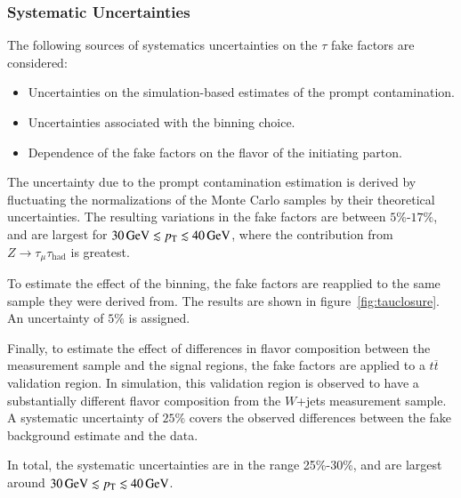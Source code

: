 \subsubsection{Systematic Uncertainties}\label{sec:ff-tau-systematics}
The following sources of systematics uncertainties on the $\tau$ fake factors are considered:

\begin{itemize}
\item Uncertainties on the simulation-based estimates of the prompt contamination.
\item Uncertainties associated with the binning choice.
\item Dependence of the fake factors on the flavor of the initiating parton.
\end{itemize}

The uncertainty due to the prompt contamination estimation is derived by fluctuating the normalizations of the Monte Carlo samples by their theoretical uncertainties. The resulting variations in the fake factors are between $5\%$-$17\%$, and  are largest for $\SI{30}{\giga\electronvolt}\lesssim p_{\text{T}} \lesssim \SI{40}{\giga\electronvolt}$, where the contribution from $Z\rightarrow \tau_{\mu}\tau_{\mathrm{had}}$ is greatest. 

To estimate the effect of the binning, the fake factors are reapplied to the same sample they were derived from. The results are shown in figure~\ref{fig:tauclosure}. An uncertainty of $5\%$ is assigned.

Finally, to estimate the effect of differences in flavor composition between the measurement sample and the signal regions, the fake factors are applied to a $t\overline{t}$ validation region. In simulation, this validation region is observed to have a substantially different flavor composition from the $W$+jets measurement sample. A systematic uncertainty of $25\%$ covers the observed differences between the fake background estimate and the data. 

In total, the systematic uncertainties are in the range 25\%-30\%, and are largest around $\SI{30}{\giga\electronvolt}\lesssim p_{\text{T}} \lesssim \SI{40}{\giga\electronvolt}$. 

